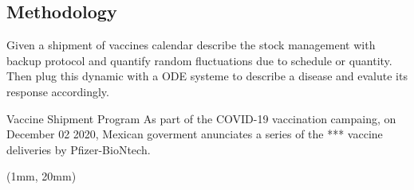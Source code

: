 \subsection{Methodology}
    \begin{frame}
        Given a shipment of vaccines calendar describe the stock management
        with backup protocol and quantify random fluctuations due to schedule or
        quantity. Then plug this dynamic with a ODE systeme to describe
        a disease and evalute its response accordingly.
    \end{frame}
%
\begin{frame}{Vaccine Shipment Program}
    As part of the COVID-19 vaccination campaing, on December 02
    2020, Mexican goverment anunciates a series of the ***
    vaccine deliveries by Pfizer-BioNtech.
    \begin{textblock*}{130mm}(1mm, 20mm)
    \end{textblock*}
 \end{frame}
 
 
